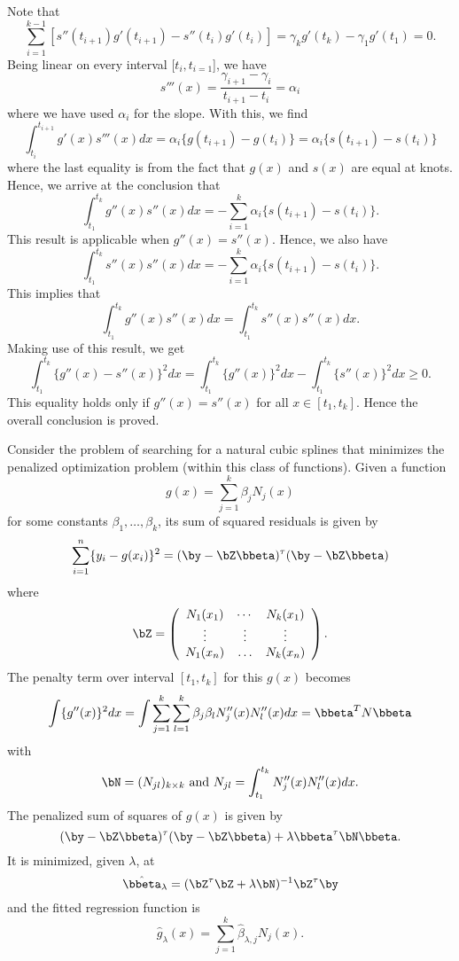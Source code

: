 Note that
\[
\sum_{i=1}^{k-1} [s''(t_{i+1}) g'(t_{i+1}) - s''(t_i) g'(t_i)]
= \gamma_k g'(t_k) - \gamma_1 g'(t_1) = 0.
\]
Being linear on every interval [$t_i, t_{i=1}$], we have
\[
s'''(x) = \frac{\gamma_{i+1} - \gamma_i}{t_{i+1} - t_i} = \alpha_i
\]
where we have used $\alpha_i$ for the slope. With this, we find
\[
 \int_{t_i}^{t_{i+1}} g'(x) s'''(x) dx 
 = \alpha_i \{g(t_{i+1}) - g(t_i)\}
 = \alpha_i \{ s(t_{i+1}) - s(t_i)\}
\]
where the last equality is from the fact that $g(x)$ and $s(x)$ are
equal at knots. Hence, we arrive at the conclusion that
\[
\int_{t_1}^{t_k}
g''(x) s''(x) dx 
=
- \sum_{i=1}^k  \alpha_i \{ s(t_{i+1}) - s(t_i)\}.
\]
This result is applicable when $g''(x) = s''(x)$. Hence, we also have
\[
\int_{t_1}^{t_k}
s''(x) s''(x) dx 
=
- \sum_{i=1}^k  \alpha_i \{ s(t_{i+1}) - s(t_i)\}.
\]
This implies that 
\[
\int_{t_1}^{t_k}
g''(x) s''(x) dx  = \int_{t_1}^{t_k}
s''(x) s''(x) dx.
\]
Making use of this result, we get
\[
\int_{t_1}^{t_k} \{ g''(x) - s''(x)\}^2 dx
=
\int_{t_1}^{t_k} \{ g''(x)\}^2 dx
-
\int_{t_1}^{t_k} \{ s''(x)\}^2 dx \geq 0.
\]
This equality holds only if $g''(x)= s''(x)$ for all $x \in [t_1, t_k]$.
Hence the overall conclusion is proved.


\vs\vs
Consider the problem of searching for a natural cubic splines 
that minimizes the penalized optimization problem (within this class
of functions). 
Given a function
\[
g(x)
=
\sum_{j=1}^k \beta_j N_j(x)
\]
for some constants $\beta_1,\ldots,\beta_k$,
its sum of squared residuals is given by
$$
\sum_{i=1}^n\{y_i- g(x_i)\}^2
=(\by - \bZ \bbeta)^\tau (\by-\bZ \bbeta)
$$
where 
$$
\bZ =\left(
 \begin{array}{ccc}
 N_{1}(x_1)&\cdots&N_{k}(x_1)\\
 \vdots&\vdots&\vdots\\
 N_{1}(x_n)&\ldots&N_{k}(x_n)\\
\end{array}
 \right).
$$
The penalty term over interval $[t_1, t_k]$ for this $g(x)$ becomes
$$
\int \{ g''(x)\}^2 dx
=
\int \sum_{j=1}^k \sum_{l=1}^k \beta_j \beta_l N_{j}''(x) N_l''(x) dx
=
\bbeta^T N \bbeta
$$
with 
$$
\bN=(N_{jl})_{k \times k}~\mbox{and}
~
N_{jl}= \int_{t_1}^{t_k} N_{j}''(x) N_{l}''(x) dx.
$$
The penalized sum of squares of $g(x)$ is given by
$$
(\by-\bZ \bbeta)^\tau (\by-\bZ \bbeta) + \lambda \bbeta^\tau  \bN \bbeta. 
$$  
It is minimized, given $\lambda$, at
$$
\hat\bbeta_{\lambda}
=
(\bZ^\tau \bZ + \lambda \bN)^{-1}\bZ^\tau \by
$$
and the fitted regression function is
\[
\hat g_{\lambda}(x)
 =\sum_{j=1}^k\hat\beta_{\lambda,j}N_{j}(x). 
\]
 
